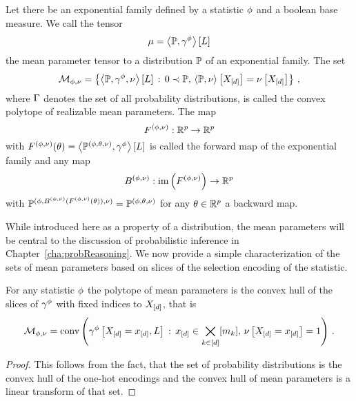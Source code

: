 \begin{definition}\label{def:meanForwardBackward}
	Let there be an exponential family defined by a statistic $\phi$ and a boolean base measure.
	We call the tensor
		\[ \mu = \left\langle \mathbb{P},\gamma^{\phi}\right\rangle \left[ L \right] \]
	the mean parameter tensor to a distribution $\mathbb{P}$ of an exponential family.
	The set 
		\[ \mathcal{M}_{\phi,\nu} = \left\{\left\langle \mathbb{P},\gamma^{\phi},\nu\right\rangle \left[ L \right] \, : \, 0\prec\mathbb{P} , \, \left\langle \mathbb{P},\nu\right\rangle \left[ X_{[d]} \right] 
		= \nu\left[X_{[d]}\right] \right\} \, , \]
	where $\Gamma$ denotes the set of all probability distributions,
	is called the convex polytope of realizable mean parameters.
	The map
		\[ F^{(\phi,\nu)} :  \mathbb{R}^{p}\rightarrow\mathbb{R}^{p}\]
	with $F^{(\phi,\nu)}(\theta) = \left\langle \mathbb{P}^{(\phi,\theta,\nu)},\gamma^{\phi}\right\rangle \left[ L \right]$ is called the forward map of the exponential family and any map
		\[ B^{(\phi,\nu)} : \mathrm{im}\left(F^{(\phi,\nu)}\right) \rightarrow \mathbb{R}^{p}\]
	with $\mathbb{P}^{(\phi,B^{(\phi,\nu)}(F^{(\phi,\nu)}(\theta)),\nu)} = \mathbb{P}^{(\phi,\theta,\nu)}$ for any $\theta\in\mathbb{R}^{p}$ a backward map.
\end{definition}


While introduced here as a property of a distribution, the mean parameters will be central to the discussion of probabilistic inference in Chapter~\ref{cha:probReasoning}.
We now provide a simple characterization of the sets of mean parameters based on slices of the selection encoding of the statistic.

\begin{theorem}\label{the:meanPolytopeConvHull}
	For any statistic $\phi$ the polytope of mean parameters is the convex hull of the slices of $\gamma^{\phi}$ with fixed indices to $X_{[d]}$, that is
	\begin{align*}
		\mathcal{M}_{\phi,\nu} 
		= \mathrm{conv}\left(\gamma^{\phi}\left[X_{[d]}=x_{[d]},L\right] \, : \, x_{[d]}\in\bigtimes_{k\in[d]}[m_{k}], \, \nu\left[X_{[d]}=x_{[d]}\right]=1\right) \, . 
	\end{align*}	
\end{theorem}
\begin{proof}
	This follows from the fact, that the set of probability distributions is the convex hull of the one-hot encodings and the convex hull of mean parameters is a linear transform of that set.
\end{proof}


